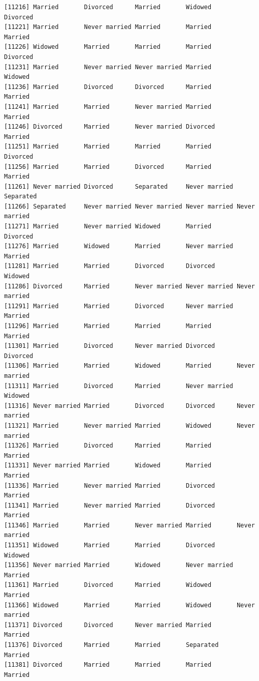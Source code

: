 \documentclass[
  letterpaper,
  DIV=11,
  numbers=noendperiod,
  oneside]{scrartcl}
\begin{document}
\begin{verbatim}
[11216] Married       Divorced      Married       Widowed       Divorced     
[11221] Married       Never married Married       Married       Married      
[11226] Widowed       Married       Married       Married       Divorced     
[11231] Married       Never married Never married Married       Widowed      
[11236] Married       Divorced      Divorced      Married       Married      
[11241] Married       Married       Never married Married       Married      
[11246] Divorced      Married       Never married Divorced      Married      
[11251] Married       Married       Married       Married       Divorced     
[11256] Married       Married       Divorced      Married       Married      
[11261] Never married Divorced      Separated     Never married Separated    
[11266] Separated     Never married Never married Never married Never married
[11271] Married       Never married Widowed       Married       Divorced     
[11276] Married       Widowed       Married       Never married Married      
[11281] Married       Married       Divorced      Divorced      Widowed      
[11286] Divorced      Married       Never married Never married Never married
[11291] Married       Married       Divorced      Never married Married      
[11296] Married       Married       Married       Married       Married      
[11301] Married       Divorced      Never married Divorced      Divorced     
[11306] Married       Married       Widowed       Married       Never married
[11311] Married       Divorced      Married       Never married Widowed      
[11316] Never married Married       Divorced      Divorced      Never married
[11321] Married       Never married Married       Widowed       Never married
[11326] Married       Divorced      Married       Married       Married      
[11331] Never married Married       Widowed       Married       Married      
[11336] Married       Never married Married       Divorced      Married      
[11341] Married       Never married Married       Divorced      Married      
[11346] Married       Married       Never married Married       Never married
[11351] Widowed       Married       Married       Divorced      Widowed      
[11356] Never married Married       Widowed       Never married Married      
[11361] Married       Divorced      Married       Widowed       Married      
[11366] Widowed       Married       Married       Widowed       Never married
[11371] Divorced      Divorced      Never married Married       Married      
[11376] Divorced      Married       Married       Separated     Married      
[11381] Divorced      Married       Married       Married       Married      

\end{verbatim}
\end{document}
